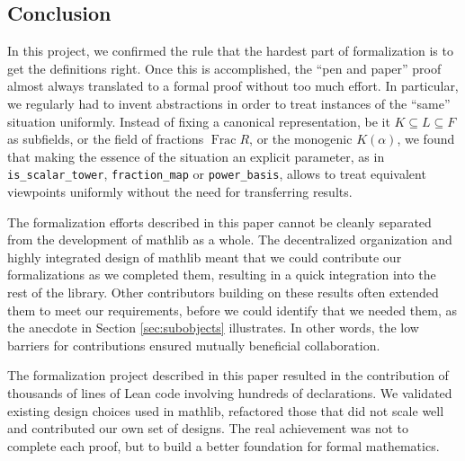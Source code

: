 \documentclass[a4paper,USenglish,cleveref, autoref, thm-restate]{lipics-v2021}
\newcommand{\lean}[1]{\texttt{#1}\xspace} %
\newcommand{\mathlib}{\textsf{mathlib}\xspace}
\DeclareMathOperator{\Frac}{Frac}
\begin{document}
\subsection{Conclusion}

In this project, we confirmed the rule that the hardest part of formalization is to get the definitions right.
Once this is accomplished, the ``pen and paper'' proof almost always translated to a formal proof without too much effort.
In particular, we regularly had to invent abstractions in order to treat instances of the ``same'' situation uniformly.
Instead of fixing a canonical representation, be it $K \subseteq L \subseteq F$ as subfields, or the field of fractions $\Frac R$, or the monogenic $K(\alpha)$, we found that making the essence of the situation an explicit parameter, as in \lean{is\_scalar\_tower}, \lean{fraction\_map} or \lean{power\_basis},
allows to treat equivalent viewpoints uniformly without the need for transferring results.

The formalization efforts described in this paper cannot be cleanly separated from the development of \mathlib as a whole.
The decentralized organization and highly integrated design of \mathlib meant that we could contribute our formalizations as we completed them, resulting in a quick integration into the rest of the library.
Other contributors building on these results often extended them to meet our requirements,
before we could identify that we needed them, as the anecdote in Section \ref{sec:subobjects} illustrates.
In other words, the low barriers for contributions ensured mutually beneficial collaboration.

The formalization project described in this paper resulted in the contribution of thousands of lines of Lean code involving hundreds of declarations.
We validated existing design choices used in \mathlib, refactored those that did not scale well
and contributed our own set of designs.
The real achievement was not to complete each proof,
but to build a better foundation for formal mathematics.



\end{document}
